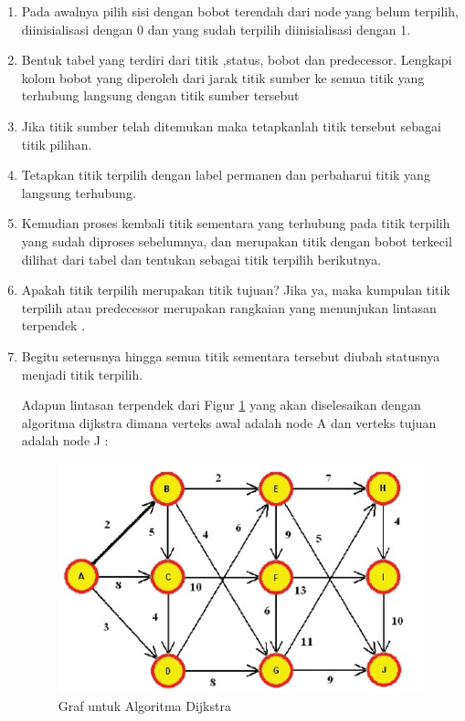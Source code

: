 \begin{enumerate}
\item Pada awalnya pilih sisi dengan bobot terendah dari node yang belum terpilih, diinisialisasi dengan 0 dan yang sudah terpilih diinisialisasi dengan 1.
\item Bentuk tabel yang terdiri dari titik ,status, bobot dan predecessor. Lengkapi kolom bobot yang diperoleh dari jarak titik sumber ke semua titik yang terhubung langsung dengan titik sumber tersebut
\item Jika titik sumber telah ditemukan maka tetapkanlah titik tersebut sebagai titik pilihan.
\item Tetapkan titik terpilih dengan label permanen dan perbaharui titik yang langsung terhubung.
\item Kemudian proses kembali titik sementara yang terhubung pada titik terpilih yang sudah diproses sebelumnya, dan merupakan titik dengan bobot terkecil dilihat dari tabel dan tentukan sebagai titik terpilih berikutnya.
\item Apakah titik terpilih merupakan titik tujuan? Jika ya, maka kumpulan titik terpilih atau predecessor merupakan rangkaian yang menunjukan lintasan terpendek .
\item Begitu seterusnya hingga semua titik sementara tersebut diubah statusnya menjadi titik terpilih.

Adapun lintasan terpendek dari Figur \ref{fig:Jalur terpendek} yang akan diselesaikan dengan algoritma dijkstra dimana verteks awal adalah node A dan verteks tujuan adalah node J :

\begin{figure}[htbp]
\begin{center}
	\includegraphics[scale=0.8]{fig/sunario-3/Graf.jpg}%
	\caption{Graf untuk Algoritma Dijkstra}%
	\label{fig:Jalur terpendek}%
\end{center}
\end{figure}


\end{enumerate}
